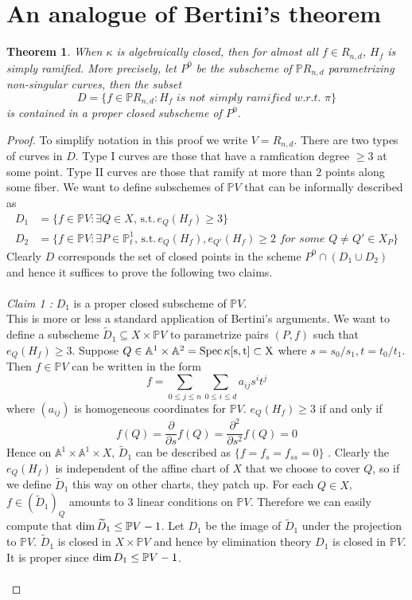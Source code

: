 \documentclass[12pt]{article}
\theoremstyle{plain}
\newtheorem{theorem}[equation]{Theorem}
\theoremstyle{definition}
\newcommand{\IA}{\mathbb{A}}
\newcommand{\IP}{\mathbb{P}}
\newcommand{\Spec}{\rm Spec\,}
\renewcommand\dim{{\rm dim\,}}
\newcommand{\<}{\langle}
\renewcommand{\>}{\rangle}
\def\wt{\widetilde}
\newcommand{\p}{\partial}
\newcommand{\st}{\, \mathrm{ s.t. }\,}
\begin{document}
\section{An analogue of Bertini's theorem} 
\begin{theorem}
When $\kappa$ is algebraically closed, then for almost all $f \in R_{n, d}$, $H_f$ is simply ramified. More precisely, let $P^0$ be the subscheme of $\IP R_{n, d}$ parametrizing non-singular curves, then the subset 
$$ D = \{ f \in \IP R_{n, d} : H_f \textit{ is not simply ramified w.r.t. } \pi \}$$ is contained in a proper closed subscheme of $P^0$. 
\end{theorem} 
\begin{proof}
To simplify notation in this proof we write $V = R_{n, d}$. 
There are two types of curves in $D$. Type I curves are those that have a ramfication degree $\ge 3$ at some point. Type II curves are those that ramify at more than $2$ points along some fiber. We want to define subschemes of $\IP V$ that can be informally described as  
\begin{align*} 
D_1 &= \{ f \in \IP V : \exists Q \in X, \st e_Q(H_f) \ge 3 \} \\
D_2 &= \{ f \in \IP V : \exists P \in \IP^1_t, \st e_{Q}(H_f), e_{Q'}(H_f) \ge 2 \textit{ for some }Q \neq Q' \in X_P \}
\end{align*}
Clearly $D$ corresponds the set of closed points in the scheme $P^0 \cap (D_1 \cup D_2)$ and hence it suffices to prove the following two claims. \\\\
\textit{Claim 1 :} $D_1$ is a proper closed subscheme of $\IP V$. \\
This is more or less a standard application of Bertini's arguments. We want to define a subscheme $\wt{D}_1 \subseteq X \times \IP V$ to parametrize pairs $(P, f)$ such that $e_Q(H_f) \ge 3$. Suppose $Q \in \IA^1 \times \IA^2 = \Spec \kappa[s, t] \subset X$ where $s = s_0/s_1, t=t_0/t_1$. Then $f \in \IP V$ can be written in the form
$$ f = \sum_{0 \le j \le n} \sum_{0 \le i \le d} a_{ij} s^i t^j $$
where $(a_{ij})$ is homogeneous coordinates for $\IP V$. $e_Q(H_f) \ge 3$ if and only if
$$ f(Q) = \frac{ \p }{\p s } f (Q) = \frac{ \p^2 }{\p s^2 } f(Q) = 0 $$
Hence on $\IA^1 \times \IA^1 \times X$, $\wt{D}_1$ can be described as $\{ f = f_s = f_{ss} = 0 \}$ . Clearly the $e_Q(H_f)$ is independent of the affine chart of $X$ that we choose to cover $Q$, so if we define $\wt{D}_1$ this way on other charts, they patch up. For each $Q \in X$, $f \in (\wt{D}_1)_Q$ amounts to $3$ linear conditions on $\IP V$. Therefore we can easily compute that $\dim \wt{D}_1 \le \IP V - 1$. Let $D_1$ be the image of $\wt{D}_1$ under the projection to $\IP V$. $\wt{D}_1$ is closed in $X \times \IP V$ and hence by elimination theory $D_1$ is closed in $\IP V$. It is proper since $\dim D_1 \le \IP V - 1$.  \\\\

\end{proof}
\end{document}
